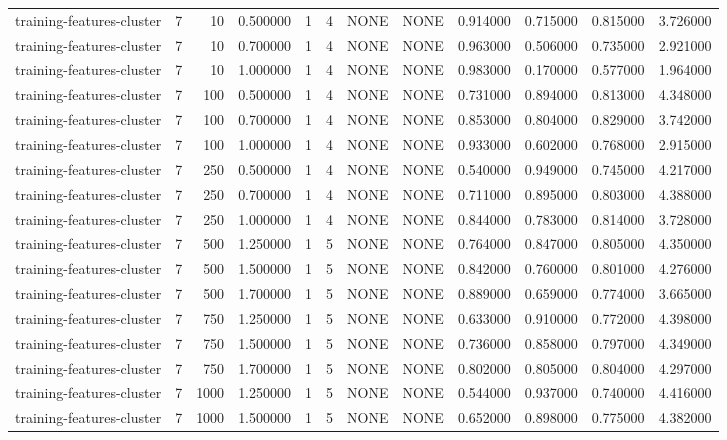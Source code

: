 \begin{tabular}{lrrrllllrrrr}
training-features-cluster & 7 & 10 & 0.500000 & 1 & 4 & NONE & NONE & 0.914000 & 0.715000 & 0.815000 & 3.726000 \\
training-features-cluster & 7 & 10 & 0.700000 & 1 & 4 & NONE & NONE & 0.963000 & 0.506000 & 0.735000 & 2.921000 \\
training-features-cluster & 7 & 10 & 1.000000 & 1 & 4 & NONE & NONE & 0.983000 & 0.170000 & 0.577000 & 1.964000 \\
training-features-cluster & 7 & 100 & 0.500000 & 1 & 4 & NONE & NONE & 0.731000 & 0.894000 & 0.813000 & 4.348000 \\
training-features-cluster & 7 & 100 & 0.700000 & 1 & 4 & NONE & NONE & 0.853000 & 0.804000 & 0.829000 & 3.742000 \\
training-features-cluster & 7 & 100 & 1.000000 & 1 & 4 & NONE & NONE & 0.933000 & 0.602000 & 0.768000 & 2.915000 \\
training-features-cluster & 7 & 250 & 0.500000 & 1 & 4 & NONE & NONE & 0.540000 & 0.949000 & 0.745000 & 4.217000 \\
training-features-cluster & 7 & 250 & 0.700000 & 1 & 4 & NONE & NONE & 0.711000 & 0.895000 & 0.803000 & 4.388000 \\
training-features-cluster & 7 & 250 & 1.000000 & 1 & 4 & NONE & NONE & 0.844000 & 0.783000 & 0.814000 & 3.728000 \\
training-features-cluster & 7 & 500 & 1.250000 & 1 & 5 & NONE & NONE & 0.764000 & 0.847000 & 0.805000 & 4.350000 \\
training-features-cluster & 7 & 500 & 1.500000 & 1 & 5 & NONE & NONE & 0.842000 & 0.760000 & 0.801000 & 4.276000 \\
training-features-cluster & 7 & 500 & 1.700000 & 1 & 5 & NONE & NONE & 0.889000 & 0.659000 & 0.774000 & 3.665000 \\
training-features-cluster & 7 & 750 & 1.250000 & 1 & 5 & NONE & NONE & 0.633000 & 0.910000 & 0.772000 & 4.398000 \\
training-features-cluster & 7 & 750 & 1.500000 & 1 & 5 & NONE & NONE & 0.736000 & 0.858000 & 0.797000 & 4.349000 \\
training-features-cluster & 7 & 750 & 1.700000 & 1 & 5 & NONE & NONE & 0.802000 & 0.805000 & 0.804000 & 4.297000 \\
training-features-cluster & 7 & 1000 & 1.250000 & 1 & 5 & NONE & NONE & 0.544000 & 0.937000 & 0.740000 & 4.416000 \\
training-features-cluster & 7 & 1000 & 1.500000 & 1 & 5 & NONE & NONE & 0.652000 & 0.898000 & 0.775000 & 4.382000 \\

\end{tabular}
